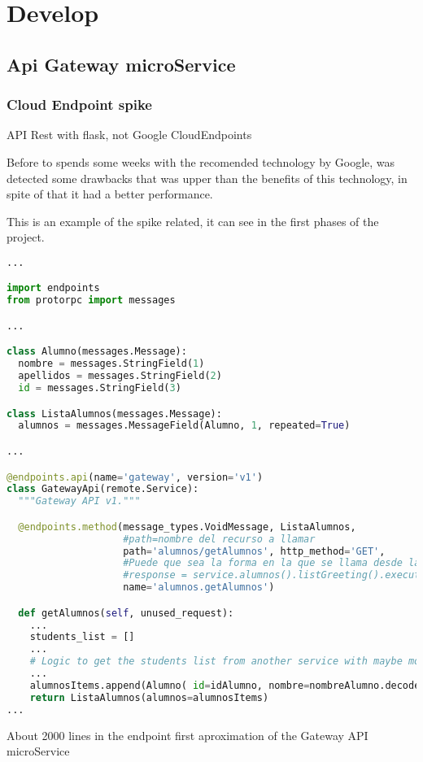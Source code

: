 \chapter{Develop}


\section{Api Gateway microService}
\subsection{Cloud Endpoint spike}

API Rest with flask, not Google CloudEndpoints

Before to spends some weeks with the recomended technology by Google, was
detected some drawbacks that was upper than the benefits of this technology,
in spite of that it had a better performance.

This is an example of the spike related, it can see in the first phases of the
project.

\begin{lstlisting}[language=python,frame=none]
...

import endpoints
from protorpc import messages

...

class Alumno(messages.Message):
  nombre = messages.StringField(1)
  apellidos = messages.StringField(2)
  id = messages.StringField(3)

class ListaAlumnos(messages.Message):
  alumnos = messages.MessageField(Alumno, 1, repeated=True)

...

@endpoints.api(name='gateway', version='v1')
class GatewayApi(remote.Service):
  """Gateway API v1."""

  @endpoints.method(message_types.VoidMessage, ListaAlumnos,
                    #path=nombre del recurso a llamar
                    path='alumnos/getAlumnos', http_method='GET',
                    #Puede que sea la forma en la que se llama desde la api:
                    #response = service.alumnos().listGreeting().execute()
                    name='alumnos.getAlumnos')

  def getAlumnos(self, unused_request):
    ...
    students_list = []
    ...
    # Logic to get the students list from another service with maybe more logic.
    ...
    alumnosItems.append(Alumno( id=idAlumno, nombre=nombreAlumno.decode('utf-8'), apellidos=apellidosAlumno.decode('utf-8') ) )
    return ListaAlumnos(alumnos=alumnosItems)
...
\end{lstlisting}
About 2000 lines in the endpoint first aproximation of the Gateway API microService




